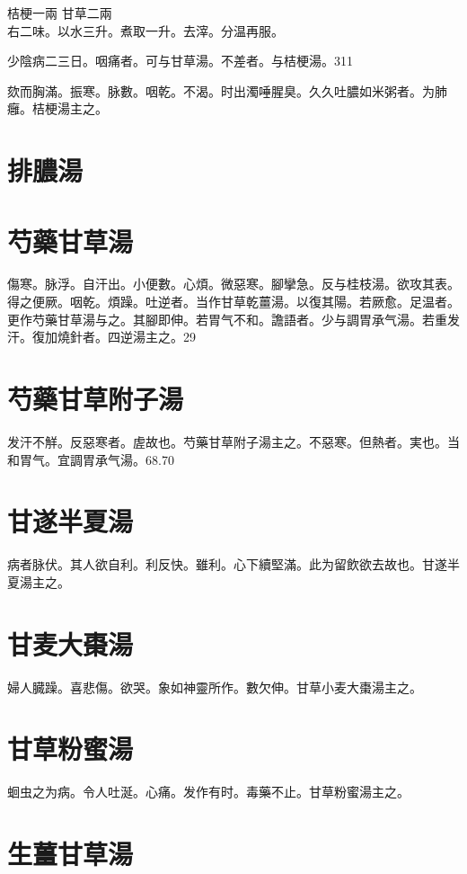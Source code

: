 \documentclass[12pt,twoside,UTF8,b5paper]{ctexbook}
\begin{document}
桔梗{\scriptsize 一兩} 甘草{\scriptsize 二兩}\\
右二味。以水三升。煮取一升。去滓。分温再服。

少陰病二三日。咽痛者。可与甘草湯。不差者。与桔梗湯。311

欬而胸滿。振寒。脉數。咽乾。不渴。时出濁唾腥臭。久久吐膿如米粥者。为肺癰。桔梗湯主之。

\section{排膿湯}

\section{芍藥甘草湯}

傷寒。脉浮。自汗出。小便數。心煩。微惡寒。腳攣急。反与桂枝湯。欲攻其表。得之便厥。咽乾。煩躁。吐逆者。当作甘草乾薑湯。以復其陽。若厥愈。足温者。更作芍藥甘草湯与之。其腳即伸。若胃气不和。譫語者。少与{調胃}承气湯。若重发汗。復加燒針者。四逆湯主之。29

\section{芍藥甘草附子湯}

发汗不觧。反惡寒者。虗故也。芍藥甘草附子湯主之。不惡寒。但熱者。実也。当和胃气。宜調胃承气湯。68.70

\section{甘遂半夏湯}

病者脉伏。其人欲自利。利反快。雖利。心下續堅滿。此为留飲欲去故也。甘遂半夏湯主之。

\section{甘麦大棗湯}

婦人臓躁。喜悲傷。欲哭。象如神靈所作。數欠伸。甘{草小}麦大棗湯主之。

\section{甘草粉蜜湯}

蛔虫之为病。令人吐涎。心痛。发作有时。毒藥不止。甘草粉蜜湯主之。

\section{生薑甘草湯}
\end{document}
